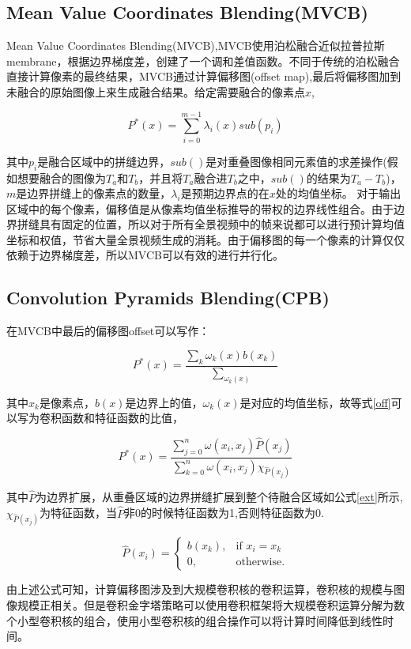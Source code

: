 \subsection{Mean Value Coordinates Blending(MVCB)}
Mean Value Coordinates Blending(MVCB),MVCB使用泊松融合近似拉普拉斯membrane，根据边界梯度差，创建了一个调和差值函数。不同于传统的泊松融合直接计算像素的最终结果，MVCB通过计算偏移图(offset map),最后将偏移图加到未融合的原始图像上来生成融合结果。给定需要融合的像素点$x$,
\begin{center}
    \begin{equation}\label{mvc}
       P^*(x)=\sum_{i=0}^{m-1}\lambda_i(x)sub(p_i)
    \end{equation}
\end{center}


其中$p_i$是融合区域中的拼缝边界，$sub()$是对重叠图像相同元素值的求差操作(假如想要融合的图像为$T_a$和$T_b$，并且将$T_a$融合进$T_b$之中，$sub()$的结果为$T_a-T_b$)，$m$是边界拼缝上的像素点的数量，$\lambda_i$是预期边界点的在$x$处的均值坐标。
对于输出区域中的每个像素，偏移值是从像素均值坐标推导的带权的边界线性组合。由于边界拼缝具有固定的位置，所以对于所有全景视频中的帧来说都可以进行预计算均值坐标和权值，节省大量全景视频生成的消耗。由于偏移图的每一个像素的计算仅仅依赖于边界梯度差，所以MVCB可以有效的进行并行化。


\subsection{Convolution Pyramids Blending(CPB)}
在MVCB中最后的偏移图offset可以写作：
\begin{center}
    \begin{equation}\label{off}
       P^*(x)=\frac{\sum_{k}\omega_k(x)b(x_k)}{\sum_{\omega_k(x)}}
    \end{equation}
\end{center}
其中$x_k$是像素点，$b(x)$是边界上的值，$\omega_k(x)$是对应的均值坐标，故等式\ref{off}可以写为卷积函数和特征函数的比值，
\begin{center}
    \begin{equation}\label{cpb}
       P^*(x)=\frac{\sum_{j=0}^{n}\omega(x_i,x_j)\hat{P}(x_j)}{\sum_{k=0}^{n}\omega(x_i,x_j)\chi_{\hat{P}(x_j)}}
    \end{equation}
\end{center}
其中$\hat{P}$为边界扩展，从重叠区域的边界拼缝扩展到整个待融合区域如公式\ref{ext}所示,$\chi_{\hat{P}(x_j)}$为特征函数，当$\hat{P}$非0的时候特征函数为1,否则特征函数为0.
\begin{center}
    \begin{equation}\label{ext}
      \hat{P}(x_i)=\begin{cases}
                     b(x_k), & \mbox{if } x_i=x_k \\
                     0, & \mbox{otherwise}.
                   \end{cases}
    \end{equation}
\end{center}
由上述公式可知，计算偏移图涉及到大规模卷积核的卷积运算，卷积核的规模与图像规模正相关。但是卷积金字塔策略可以使用卷积框架将大规模卷积运算分解为数个小型卷积核的组合，使用小型卷积核的组合操作可以将计算时间降低到线性时间。

